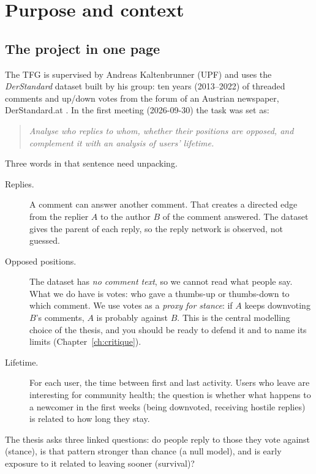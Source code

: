 \chapter{Purpose and context}\label{ch:purpose}

\section{The project in one page}
The TFG is supervised by Andreas Kaltenbrunner (UPF) and uses the \emph{DerStandard} dataset built by his group: ten years (2013--2022) of threaded comments and up/down votes from the forum of an Austrian newspaper, DerStandard.at . In the first meeting (2026-09-30) the task was set as:

\begin{quote}
\emph{Analyse who replies to whom, whether their positions are opposed, and complement it with an analysis of users' lifetime.}
\end{quote}

Three words in that sentence need unpacking.
\begin{description}
  \item[Replies.] A comment can answer another comment. That creates a directed edge from the replier $A$ to the author $B$ of the comment answered. The dataset gives the parent of each reply, so the reply network is observed, not guessed.
  \item[Opposed positions.] The dataset has \emph{no comment text}, so we cannot read what people say. What we do have is votes: who gave a thumbs-up or thumbs-down to which comment. We use votes as a \emph{proxy for stance}: if $A$ keeps downvoting $B$'s comments, $A$ is probably against $B$. This is the central modelling choice of the thesis, and you should be ready to defend it and to name its limits (Chapter~\ref{ch:critique}).
  \item[Lifetime.] For each user, the time between first and last activity. Users who leave are interesting for community health; the question is whether what happens to a newcomer in the first weeks (being downvoted, receiving hostile replies) is related to how long they stay.
\end{description}

\begin{idea}
The thesis asks three linked questions: do people reply to those they vote against (stance), is that pattern stronger than chance (a null model), and is early exposure to it related to leaving sooner (survival)?
\end{idea}

